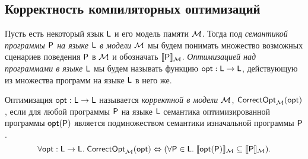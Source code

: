 \subsection{Корректность компиляторных оптимизаций}
Пусть есть некоторый язык $\mathsf{L}$ и его модель памяти $\mathcal{M}$. Тогда под \emph{семантикой программы $\mathsf{P}$ на языке $\mathsf{L}$ в модели $\mathcal{M}$}
мы будем понимать множество возможных сценариев поведения $\mathsf{P}$ в $\mathcal{M}$ и обозначать $\llbracket \mathsf{P} \rrbracket_{\mathcal{M}}$.
\emph{Оптимизацией над программами в языке $\mathsf{L}$} мы будем называть функцию $\mathsf{opt} : \mathsf{L} \rightarrow \mathsf{L}$, действующую из
множества программ на языке $\mathsf{L}$ в него же.
\begin{definition}
  Оптимизация $\mathsf{opt} : \mathsf{L} \rightarrow \mathsf{L}$ называется \emph{корректной в модели $\mathcal{M}$},
  $\mathsf{CorrectOpt}_{\mathcal{M}}(\mathsf{opt})$, если для любой программы $\mathsf{P}$ на языке $\mathsf{L}$
  семантика оптимизированной программы $\mathsf{opt}(\mathsf{P})$ является подмножеством семантики изначальной программы $\mathsf{P}$.
  \[\forall \mathsf{opt} : \mathsf{L} \rightarrow \mathsf{L}. \; \mathsf{CorrectOpt}_{\mathcal{M}}(\mathsf{opt}) \Leftrightarrow (\forall \mathsf{P} \in \mathsf{L}. \; \llbracket \mathsf{opt}(\mathsf{P}) \rrbracket_{\mathcal{M}} \subseteq \llbracket \mathsf{P} \rrbracket_{\mathcal{M}}). \]
\end{definition}

